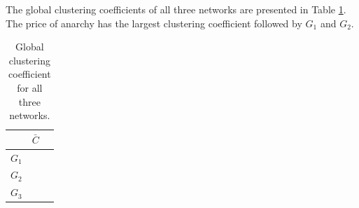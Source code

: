 \documentclass{article}
\theoremstyle{definition}
\newcommand{\prisonerscc}{}
\newcommand{\pricecc}{}
\newcommand{\auctioncc}{}
\begin{document}
The global clustering coefficients of all three networks are presented in Table
\ref{table:clustering}. The price of anarchy has the largest clustering coefficient
followed by \(G_1\) and \(G_2\).


\begin{table}[!hbtp]
    \begin{center}
    \begin{tabular}{lcc}
        \toprule
                  & \textbf{\(\bar{C}\)}\\
        \midrule 
        \(G_1\) & \prisonerscc\\
        \(G_2\) & \auctioncc\\
        \(G_3\) & \pricecc\\
        \bottomrule
    \end{tabular}
    \end{center}
    \caption{Global clustering coefficient for all three networks.}
    \label{table:clustering}
\end{table}




\end{document}
